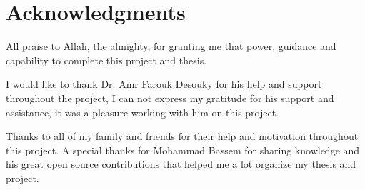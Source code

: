 \chapter*{Acknowledgments}
\label{chap:ack}
All praise to Allah, the almighty, for granting me that power, guidance and capability to complete this project and thesis.

\newParagraph
I would like to thank Dr. Amr Farouk Desouky for his help and support throughout the project, I can not express my
gratitude for his support and assistance, it was a pleasure working with him on this project.

\newParagraph
Thanks to all of my family and friends for their help and motivation throughout this project. A special thanks for Mohammad Bassem for sharing
knowledge and his great open source contributions that helped me a lot organize my thesis and project.
